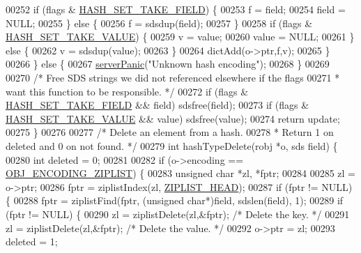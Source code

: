 \begin{DoxyCode}
00252             \textcolor{keywordflow}{if} (flags & \hyperlink{server_8h_a9c13f8e0e439bfde94687cb01ab81b4b}{HASH\_SET\_TAKE\_FIELD}) \{
00253                 f = field;
00254                 field = NULL;
00255             \} \textcolor{keywordflow}{else} \{
00256                 f = sdsdup(field);
00257             \}
00258             \textcolor{keywordflow}{if} (flags & \hyperlink{server_8h_a6835ddf42816b819b74a677170d6f304}{HASH\_SET\_TAKE\_VALUE}) \{
00259                 v = value;
00260                 value = NULL;
00261             \} \textcolor{keywordflow}{else} \{
00262                 v = sdsdup(value);
00263             \}
00264             dictAdd(o->ptr,f,v);
00265         \}
00266     \} \textcolor{keywordflow}{else} \{
00267         \hyperlink{server_8h_a11cc378e7778a830b41240578de3b204}{serverPanic}(\textcolor{stringliteral}{"Unknown hash encoding"});
00268     \}
00269 
00270     \textcolor{comment}{/* Free SDS strings we did not referenced elsewhere if the flags}
00271 \textcolor{comment}{     * want this function to be responsible. */}
00272     \textcolor{keywordflow}{if} (flags & \hyperlink{server_8h_a9c13f8e0e439bfde94687cb01ab81b4b}{HASH\_SET\_TAKE\_FIELD} && field) sdsfree(field);
00273     \textcolor{keywordflow}{if} (flags & \hyperlink{server_8h_a6835ddf42816b819b74a677170d6f304}{HASH\_SET\_TAKE\_VALUE} && value) sdsfree(value);
00274     \textcolor{keywordflow}{return} update;
00275 \}
00276 
00277 \textcolor{comment}{/* Delete an element from a hash.}
00278 \textcolor{comment}{ * Return 1 on deleted and 0 on not found. */}
00279 \textcolor{keywordtype}{int} hashTypeDelete(robj *o, sds field) \{
00280     \textcolor{keywordtype}{int} deleted = 0;
00281 
00282     \textcolor{keywordflow}{if} (o->encoding == \hyperlink{server_8h_aabf064ede983103f1fd0df2086e84eee}{OBJ\_ENCODING\_ZIPLIST}) \{
00283         \textcolor{keywordtype}{unsigned} \textcolor{keywordtype}{char} *zl, *fptr;
00284 
00285         zl = o->ptr;
00286         fptr = ziplistIndex(zl, \hyperlink{ziplist_8h_a88d32e547c509220e1c50cd9306186ba}{ZIPLIST\_HEAD});
00287         \textcolor{keywordflow}{if} (fptr != NULL) \{
00288             fptr = ziplistFind(fptr, (\textcolor{keywordtype}{unsigned} \textcolor{keywordtype}{char}*)field, sdslen(field), 1);
00289             \textcolor{keywordflow}{if} (fptr != NULL) \{
00290                 zl = ziplistDelete(zl,&fptr); \textcolor{comment}{/* Delete the key. */}
00291                 zl = ziplistDelete(zl,&fptr); \textcolor{comment}{/* Delete the value. */}
00292                 o->ptr = zl;
00293                 deleted = 1;

\end{DoxyCode}
